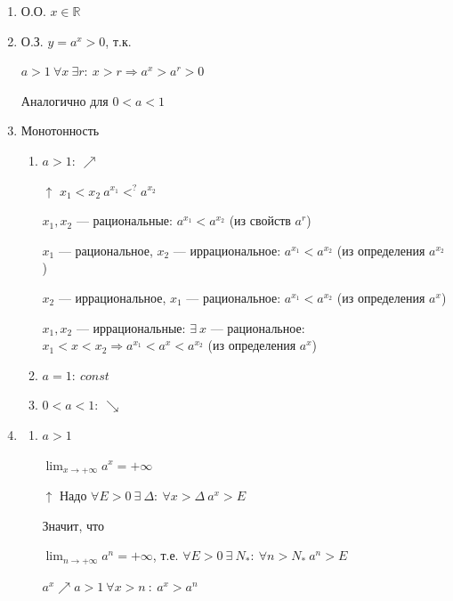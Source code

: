 \documentclass{article}
\begin{document}
    \begin{enumerate}
        \item О.О. \( x \in \mathbb{R} \)

        \item О.З. \( y = a^x > 0 \), т.к.
        
        \( a > 1\ \forall x\ \exists r:\ x > r \Rightarrow a^x > a^r > 0 \)

        Аналогично для \( 0 < a < 1 \)

        \item Монотонность
        
        \begin{enumerate}
            \item \( a > 1:\ \nearrow \) 
            
            \( \uparrow \) \(x_1 < x_2\ a^{x_1} <^? a^{x_2} \)

            \( x_1, x_2 \) --- рациональные: \( a^{x_1} < a^{x_2} \) (из свойств \(a^r\))

            \( x_1 \) --- рациональное, \(x_2\) --- иррациональное: \(a^{x_1} < a^{x_2}\)  (из определения \(a^{x_2}\))
            
            \(x_2\) --- иррациональное, \(x_1\) --- рациональное: \(a^{x_1} < a^{x_2}\) (из определения \(a^x\))

            \( x_1, x_2 \) --- иррациональные: \( \exists\ x \) --- рациональное: \( x_1 < x < x_2 \Rightarrow a^{x_1} < a^x < a^{x_2} \) (из определения \(a^x\))
            \item \( a = 1:\ const \)
            \item \( 0 < a < 1:\ \searrow \)
        \end{enumerate}
        
        \item 
        \begin{enumerate}
            \item \(a > 1\)

            \(\lim_{x \to +\infty} a^x = +\infty\)
            
            \(\uparrow\) Надо \(\forall E > 0\ \exists\ \Delta:\ \forall x > \Delta\ a^x > E\)

            Значит, что 

            \( \lim_{n \to +\infty} a^n = +\infty \), т.е. \( \forall E > 0\ \exists\ N_*:\ \forall n > N_*\ a^n > E \)
            
            \(a^x \nearrow a > 1\ \forall x > n\ :\ a^x > a^n\)
            

\end{enumerate}
\end{enumerate}
\end{document}
